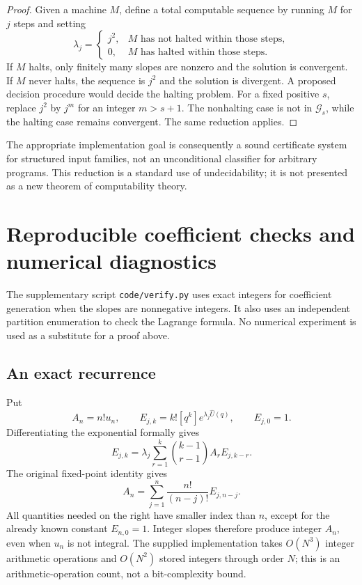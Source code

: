 \documentclass[11pt,a4paper]{article}
\numberwithin{equation}{section}
\theoremstyle{definition}
\theoremstyle{remark}
\newcommand{\Gev}{\mathcal G}
\newcommand{\Uhat}{\widehat U}
\begin{document}
\begin{proof}
Given a machine $M$, define a total computable sequence by running $M$
for $j$ steps and setting
\[
 \lambda_j=\begin{cases}
 j^2,&M\text{ has not halted within those steps},\\
 0,&M\text{ has halted within those steps}.
 \end{cases}
\]
If $M$ halts, only finitely many slopes are nonzero and the solution is
convergent.  If $M$ never halts, the sequence is $j^2$ and the solution is
divergent.  A proposed decision procedure would decide the halting problem.
For a fixed positive $s$, replace $j^2$ by $j^m$ for an integer $m>s+1$.
The nonhalting case is not in $\Gev_s$, while the halting case remains
convergent.  The same reduction applies.
\end{proof}

The appropriate implementation goal is consequently a sound certificate
system for structured input families, not an unconditional classifier for
arbitrary programs.  This reduction is a standard use of undecidability;
it is not presented as a new theorem of computability theory.

\section{Reproducible coefficient checks and numerical diagnostics}
\label{sec:computations}

The supplementary script \texttt{code/verify.py} uses exact integers for
coefficient generation when the slopes are nonnegative integers.  It also
uses an independent partition enumeration to check the Lagrange formula.
No numerical experiment is used as a substitute for a proof above.

\subsection{An exact recurrence}
Put
\[
 A_n=n!u_n,
 \qquad E_{j,k}=k![q^k]e^{\lambda_j\Uhat(q)},\qquad E_{j,0}=1.
\]
Differentiating the exponential formally gives
\begin{equation}
 E_{j,k}=\lambda_j\sum_{r=1}^k
           \binom{k-1}{r-1}A_rE_{j,k-r}.
 \label{eq:exactrecurrence1}
\end{equation}
The original fixed-point identity gives
\begin{equation}
 A_n=\sum_{j=1}^n\frac{n!}{(n-j)!}E_{j,n-j}.
 \label{eq:exactrecurrence2}
\end{equation}
All quantities needed on the right have smaller index than $n$, except
for the already known constant $E_{n,0}=1$.  Integer slopes therefore
produce integer $A_n$, even when $u_n$ is not integral.  The supplied
implementation takes $O(N^3)$ integer arithmetic operations and
$O(N^2)$ stored integers through order $N$; this is an arithmetic-operation
count, not a bit-complexity bound.
\end{document}
